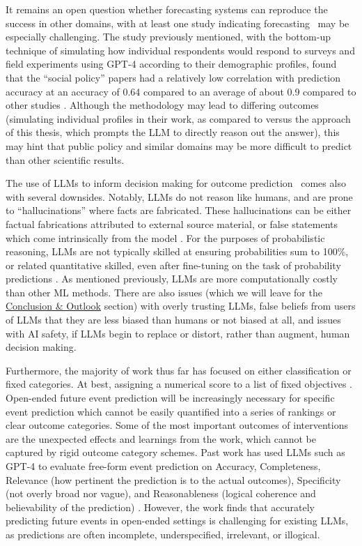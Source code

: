 \documentclass[12pt,a4paper]{article}
\begin{document}
It remains an open question whether forecasting systems can reproduce the success in other domains, with at least one study indicating forecasting \ABSTRACT\ may be especially challenging. The study previously mentioned, with the bottom-up technique of simulating how individual respondents would respond to surveys and field experiments using GPT-4 according to their demographic profiles, found that the ``social policy'' papers had a relatively low correlation with prediction accuracy at an accuracy of 0.64 compared to an average of about 0.9 compared to other studies . Although the methodology may lead to differing outcomes (simulating individual profiles in their work, as compared to versus the approach of this thesis, which prompts the LLM to directly reason out the answer), this may hint that public policy and similar domains may be more difficult to predict than other scientific results.

The use of LLMs to inform decision making for outcome prediction \ABSTRACT\ comes also with several downsides. Notably, LLMs do not reason like humans, and are prone to ``hallucinations''  where facts are fabricated. These hallucinations can be either factual fabrications attributed to external source material, or false statements which come intrinsically from the model . For the purposes of probabilistic reasoning, LLMs are not typically skilled at ensuring probabilities sum to 100\%, or related quantitative skilled, even after fine-tuning on the task of probability predictions . As mentioned previously, LLMs are more computationally costly than other ML methods. There are also issues (which we will leave for the \hyperref[sec:conclusion_outlook]{Conclusion \& Outlook} section) with overly trusting LLMs, false beliefs from users of LLMs that they are less biased than humans or not biased at all, and issues with AI safety, if LLMs begin to replace or distort, rather than augment, human decision making.

Furthermore, the majority of work thus far has focused on either classification or fixed categories. At best, assigning a numerical score to a list of fixed objectives  . Open-ended future event prediction will be increasingly necessary for specific event prediction which cannot be easily quantified into a series of rankings or clear outcome categories. Some of the most important outcomes of interventions are the unexpected effects and learnings from the work, which cannot be captured by rigid outcome category schemes. Past work has used LLMs such as GPT-4 to evaluate free-form event prediction on Accuracy, Completeness, Relevance (how pertinent the prediction is to the actual outcomes), Specificity (not overly broad nor vague), and Reasonableness (logical coherence and believability of the prediction) . However, the work finds that accurately predicting future events in open-ended settings is challenging for existing LLMs, as predictions are often incomplete, underspecified, irrelevant, or illogical.
\end{document}

